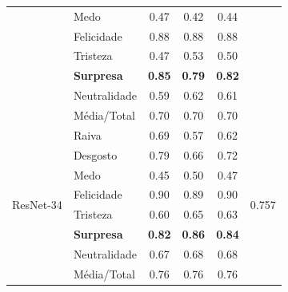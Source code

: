 \documentclass{beamer}
\begin{document}
\begin{frame}
\begin{table}[]
\begin{tabular}{llcccc}
                                    & Medo                  & 0.47              & 0.42               & 0.44              &                                 \\
                                    & Felicidade            & 0.88              & 0.88               & 0.88              &                                 \\
                                    & Tristeza              & 0.47              & 0.53               & 0.50              &                                 \\
                                    & \scriptsize \textbf{Surpresa}              & \scriptsize \textbf{0.85}              & \scriptsize \textbf{0.79}               & \scriptsize \textbf{0.82}              &                                 \\
                                    & Neutralidade          & 0.59              & 0.62               & 0.61              &                                 \\
                                    & Média/Total           & 0.70              & 0.70               & 0.70              &                                 \\ \hline
\multirow{8}{*}{ResNet-34} & Raiva        & 0.69     & 0.57      & 0.62     & \multirow{8}{*}{0.757} \\
                                    & Desgosto     & 0.79     & 0.66      & 0.72     &                                 \\
                                    & Medo         & 0.45     & 0.50      & 0.47     &                                 \\
                                    & Felicidade   & 0.90     & 0.89      & 0.90     &                                 \\
                                    & Tristeza     & 0.60     & 0.65      & 0.63     &                                 \\
                                    & \scriptsize \textbf{Surpresa}     & \scriptsize \textbf{0.82}     & \scriptsize \textbf{0.86}      & \scriptsize \textbf{0.84}     &                                 \\
                                    & Neutralidade & 0.67     & 0.68      & 0.68     &                                 \\
                                    & Média/Total  & 0.76     & 0.76      & 0.76     &                                 \\ \hline
\end{tabular}
\end{table} 
\end{frame}
\end{document}
